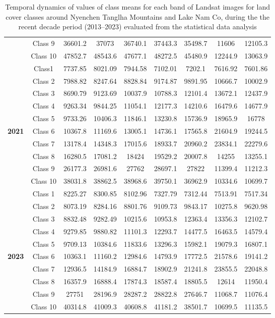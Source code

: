 \documentclass[final,5p,times,twocolumn]{elsarticle}
\begin{document}
\begin{table}[ht!]
\begin{tabular}{| ccccccccc |}
     & Class 9 & 36601.2 & 37073 & 36740.1 & 37443.3 & 35498.7 & 11606 & 12105.3 \\
     & Class 10 & 47852.7 & 48543.6 & 47677.1 & 48272.5 & 45480.9 & 12244.9 & 13063.9 \\
     \midrule
    & Class1 & 7737.85 & 8021.09 & 7944.58 & 7102.01 & 7202.1 & 7616.92 & 7601.86 \\
    & Class 2 & 7988.82 & 8247.64 & 8828.84 & 9174.87 & 9891.95 & 10666.7 & 10002.9 \\
     & Class 3 & 8690.79 & 9123.69 & 10037.9 & 10788.3 & 12101.4 & 13672.1 & 12437.9\\
     & Class 4 & 9263.34 & 9844.25 & 11054.1 & 12177.3 & 14210.6 & 16479.6 & 14677.9 \\
     & Class 5 & 9733.26 & 10406.3 & 11846.1 & 13230.8 & 15736.9 & 18965.9 & 16778 \\
     \textbf{2021} & Class 6 & 10367.8 & 11169.6 & 13005.1 & 14736.1 & 17565.8 & 21604.9 & 19244.5 \\
     & Class 7 & 13178.4 & 14348.3 & 17015.6 & 18933.7 & 20960.2 & 23834.1 & 22279.6 \\
     & Class 8 & 16280.5 & 17081.2 & 18424 & 19529.2 & 20007.8 & 14255 & 13255.1 \\
     & Class 9 & 26177.3 & 26981.6 & 27762 & 28697.1 & 27822 & 11399.4 & 11212.3 \\
     & Class 10 & 38031.8 & 38862.5 & 38968.6 & 39750.1 & 36962.9 & 10334.6 & 10699.7 \\
     \midrule
    & Class 1 & 8225.27 & 8300.85 & 8102.96 & 7327.79 & 7312.44 & 7513.91 & 7517.34 \\
    & Class 2 & 8073.19 & 8284.16 &8801.76 & 9109.73 & 9843.17 & 10275.8 & 9620.98 \\
    & Class 3 & 8832.48 & 9282.49 & 10215.6 & 10953.8 & 12363.4 & 13356.3 & 12102.7 \\
    & Class 4 & 9279.85 & 9880.82 & 11101.3 & 12293.7 & 14477.5 & 16463.5 & 14579.4 \\
    & Class 5 & 9709.13 & 10384.6 & 11833.6 & 13296.3 & 15982.1 & 19079.3 & 16807.1 \\
    \textbf{2023} & Class 6 & 10363.1 & 11160.2 & 12984.6 & 14793.9 & 17772.5 & 21578.6 & 19141.2 \\
    &  Class 7 & 12936.5 & 14184.9 & 16884.7 & 18902.9 & 21241.8 & 23855.5 & 22048.8 \\
    & Class 8 & 16357.9 & 16888.4 & 17874.3 & 18587.4 & 18805.5 & 12614 & 11950.4 \\
    & Class 9 & 27751 & 28196.9 & 28287.2 & 28822.8 & 27646.7 & 11068.7 & 11076.4 \\
    & Class 10 & 40314.8 & 41009.3 & 40608.8 & 41181.2 & 38501.7 & 10699.5 & 11135.5\\
    \bottomrule
     \end{tabular}
  \caption{Temporal dynamics of values of class means for each band of Landsat images for land cover classes around Nyenchen Tanglha Mountains and Lake Nam Co, during the the recent decade period (2013--2023) evaluated from the statistical data analysis}
  \label{tab01}
\end{table}
\end{document}
